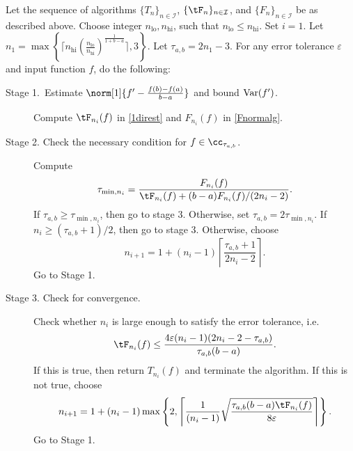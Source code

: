 \begin{algo} \label{multistageintegalgo}
Let the sequence of algorithms $\{T_n\}_{n\in \mathcal{I}}$, $\{\tF_n\}_{n\in \mathcal{I}}$, and $\{F_n\}_{n\in \mathcal{I}}$ be as described above.
Choose integer $n_{\text{lo}},n_{\text{hi}}$, such that $n_{\text{lo}}\leq n_{\text{hi}}$. Set $i=1$. Let $n_1=\max\left\{\lceil n_{\text{hi}}\left(\frac{n_{\text{lo}}}{n_{\text{hi}}}\right)^{\frac{1}{1+b-a}}\rceil,3\right\}$. Let $\tau_{a,b}=2n_1-3$. For any error tolerance $\varepsilon$ and input function $f$, do the following:
\begin{description}
\item[Stage 1.\ Estimate {$\norm[1]{f'-\frac{f(b)-f(a)}{b-a}}$} and bound {$\operatorname{Var}(f')$}.] Compute $\tF_{n_i}(f)$ in \eqref{1direst} and $F_{n_i}(f)$ in \eqref{Fnormalg}.

\item[Stage 2. Check the necessary condition for $f \in \cc_{\tau_{a,b}}$.] Compute
    \begin{align*}
     \tau_{\min,n_i} =  \frac{F_{n_i}(f)}{\tF_{n_i}(f)+(b-a)F_{n_i}(f)/(2n_i-2)}.
    \end{align*}
If $\tau_{a,b} \ge \tau_{\min,n_i}$, then go to stage 3.  Otherwise, set $\tau_{a,b} = 2\tau_{\min,n_i}$.  If $n_i \ge (\tau_{a,b}+1)/2$, then go to stage 3.  Otherwise, choose
$$
n_{i+1}=1+ (n_i-1)\left\lceil\frac{\tau_{a,b}+1}{2n_i-2}\right\rceil.
$$
Go to Stage 1.

\item[Stage 3. Check for convergence.] Check whether $n_i$ is large enough to satisfy the error tolerance, i.e.
    \begin{equation*}
     \tF_{n_i}(f) \le \frac{4\varepsilon(n_i-1)(2n_i-2 - \tau_{a,b})}{\tau_{a,b}(b-a)}.
    \end{equation*}
If this is true, then return $T_{n_i}(f)$ and terminate the algorithm.   If this is not true, choose
$$
n_{i+1}=1+ (n_i-1)\max\left\{2,\left\lceil\frac{1}{(n_i-1)}\sqrt{\frac{\tau_{a,b}(b-a) \tF_{n_i}(f)}{8\varepsilon}}\right\rceil\right\}.
$$
Go to Stage 1.
\end{description}
\end{algo}

